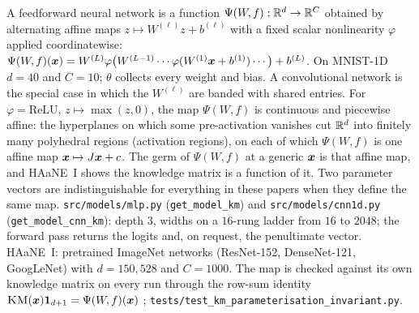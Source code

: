 {A feedforward neural network is a function $\Psi(W\!,f):\mathbb{R}^d\to\mathbb{R}^C$ obtained by alternating affine maps $z\mapsto W^{(\ell)}z+b^{(\ell)}$ with a fixed scalar nonlinearity $\varphi$ applied coordinatewise: $\Psi(W\!,f)(\boldsymbol{x})=W^{(L)}\varphi\bigl(W^{(L-1)}\cdots\varphi(W^{(1)}\boldsymbol{x}+b^{(1)})\cdots\bigr)+b^{(L)}$. On MNIST-1D $d=40$ and $C=10$; $\theta$ collects every weight and bias. A convolutional network is the special case in which the $W^{(\ell)}$ are banded with shared entries.}
{For $\varphi=\mathrm{ReLU}$, $z\mapsto\max(z,0)$, the map $\Psi(W\!,f)$ is continuous and piecewise affine: the hyperplanes on which some pre-activation vanishes cut $\mathbb{R}^d$ into finitely many polyhedral regions (activation regions), on each of which $\Psi(W\!,f)$ is one affine map $\boldsymbol{x}\mapsto J\boldsymbol{x}+c$. The germ of $\Psi(W\!,f)$ at a generic $\boldsymbol{x}$ is that affine map, and HAaNE~I shows the knowledge matrix is a function of it. Two parameter vectors are indistinguishable for everything in these papers when they define the same map.}
{\texttt{src/models/mlp.py} (\texttt{get\_model\_km}) and \texttt{src/models/cnn1d.py} (\texttt{get\_model\_cnn\_km}): depth $3$, widths on a $16$-rung ladder from $16$ to $2048$; the forward pass returns the logits and, on request, the penultimate vector. HAaNE~I: pretrained ImageNet networks (ResNet-152, DenseNet-121, GoogLeNet) with $d=150{,}528$ and $C=1000$.}
{The map is checked against its own knowledge matrix on every run through the row-sum identity $\textsc{KM}(\boldsymbol{x})\boldsymbol{1}_{d+1}=\Psi(W\!,f)(\boldsymbol{x})$ ; \texttt{tests/test\_km\_parameterisation\_invariant.py}.}
